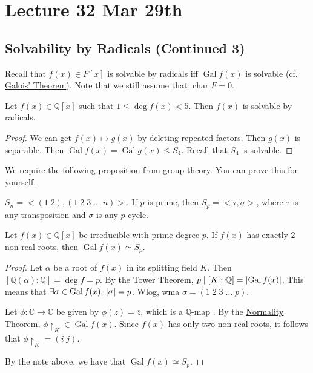 \documentclass[notoc,notitlepage,nobib]{tufte-book}
\DeclareMathOperator{\Gal}{Gal}
\DeclareMathOperator{\Char}{char}
\begin{document}


\chapter{Lecture 32 Mar 29th}%
\label{chp:lecture_32_mar_29th}

\section{Solvability by Radicals (Continued 3)}%
\label{sec:solvability_by_radicals_continued_3}

Recall that $f(x) \in F[x]$ is solvable by radicals iff $\Gal f(x)$ is solvable
(cf. \hyperref[thm:galois_theorem]{Galois' Theorem}). Note that we still assume
that $\Char F = 0$.

\begin{eg}
  Let $f(x) \in \mathbb{Q}[x]$ such that $1 \leq \deg f(x) < 5$. Then $f(x)$ is
  solvable by radicals.

  \begin{proof}
  We can get $f(x) \mapsto g(x)$ by deleting repeated factors. Then $g(x)$ is
  separable.  Then $\Gal f(x) = \Gal g(x) \leq S_4$. Recall that $S_4$ is
  solvable.
  \end{proof}
\end{eg}

We require the following proposition from group theory. You can prove this
for yourself.

\begin{note}
  $S_n = <(1 \; 2), (1 \; 2 \; 3 \; \hdots \; n)>$. If $p$ is prime, then $S_p =
  <\tau, \sigma>$, where $\tau$ is any transposition and $\sigma$ is any
  $p$-cycle.
\end{note}

\begin{lemma}
  Let $f(x) \in \mathbb{Q}[x]$ be irreducible with prime degree $p$. If $f(x)$ 
  has exactly $2$ non-real roots, then $\Gal f(x) \simeq S_p$.
\end{lemma}

\begin{proof}
  Let $\alpha$ be a root of $f(x)$ in its splitting field $K$. Then $[
  \mathbb{Q}(\alpha) : \mathbb{Q} ] = \deg f = p$. By the Tower Theorem, $p \mid
  [ K : \mathbb{Q} ] = \abs{\Gal f(x)}$. This means that $\exists \sigma \in
  \Gal f(x), \, \abs{\sigma} = p$. Wlog, wma $\sigma = (1 \; 2 \; 3 \; \hdots \;
  p)$.
  
  Let $\phi : \mathbb{C} \to \mathbb{C}$ be given by $\phi(z) = \overline{z}$,
  which is a $\mathbb{Q}$-map . By
  the \hyperref[thm:normality_theorem]{Normality Theorem}, $\phi
  \restriction_{K} \in \Gal f(x)$. Since $f(x)$ has only two non-real roots, it
  follows that $\phi \restriction_{K} = (i \; j)$.

  By the note above, we have that $\Gal f(x) \simeq S_p$.
\end{proof}
\end{document}
